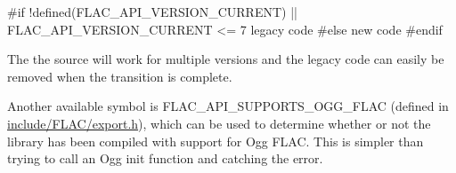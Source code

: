 \begin{DoxyCode}
\textcolor{preprocessor}{#if !defined(FLAC\_API\_VERSION\_CURRENT) || FLAC\_API\_VERSION\_CURRENT <= 7}
  legacy code
\textcolor{preprocessor}{#else}
  \textcolor{keyword}{new} code
\textcolor{preprocessor}{#endif}
\end{DoxyCode}


The the source will work for multiple versions and the legacy code can easily be removed when the transition is complete.

Another available symbol is F\+L\+A\+C\+\_\+\+A\+P\+I\+\_\+\+S\+U\+P\+P\+O\+R\+T\+S\+\_\+\+O\+G\+G\+\_\+\+F\+L\+AC (defined in \hyperlink{export_8h}{include/\+F\+L\+A\+C/export.\+h}), which can be used to determine whether or not the library has been compiled with support for Ogg F\+L\+AC. This is simpler than trying to call an Ogg init function and catching the error. 
